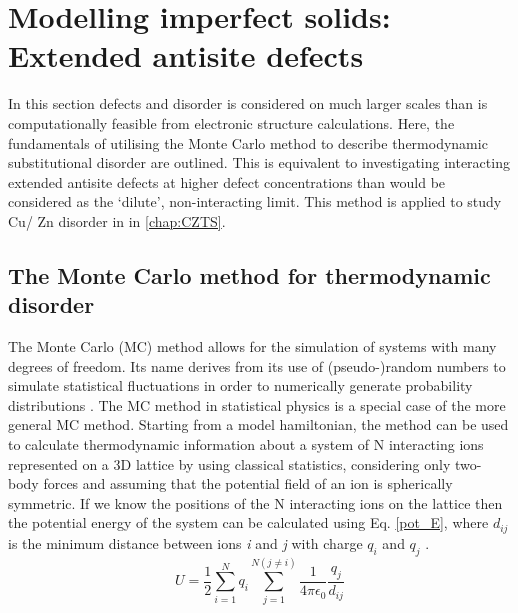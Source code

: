 \documentclass[11pt, twoside]{report}
\begin{document}
\section{Modelling imperfect solids: Extended antisite defects}\label{MC}
In this section defects and disorder is considered on much larger scales than is computationally feasible from electronic structure calculations.
Here, the fundamentals of utilising the Monte Carlo method to describe thermodynamic substitutional disorder are outlined. This is equivalent to investigating interacting extended antisite defects at higher defect concentrations than would be considered as the `dilute', non-interacting limit. This method is applied to study Cu/ Zn disorder in {\CZTS} in \autoref{chap:CZTS}.

\subsection{The Monte Carlo method for thermodynamic disorder}
The Monte Carlo (MC) method allows for the simulation of systems with many degrees of freedom. Its name derives from its use of (pseudo-)random numbers to simulate statistical fluctuations in order to numerically generate probability distributions \cite{MC3}.
The MC method in statistical physics is a special case of the more general MC method.
Starting from a model hamiltonian, the method can be used to calculate thermodynamic information about a system of N interacting ions represented on a 3D lattice by using classical statistics, considering only two-body forces and assuming that the potential field of an ion is spherically symmetric. If we know the positions of the N interacting ions on the lattice then the potential energy of the system can be calculated using Eq. \ref{pot_E}, where $d_{ij}$ is the minimum distance between ions \textit{i} and \textit{j} with charge $q_i$ and $q_j$  \cite{Metropolis}.
\begin{equation}\label{pot_E}
U = \frac{1}{2} \sum_{i=1}^N q_i \sum_{j=1}^{N(j \neq i)} \frac{1}{4 \pi \epsilon_0}\frac{q_j}{d_{ij}}
\end{equation}
\end{document}

